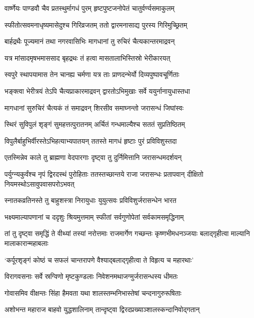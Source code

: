 \twolineshloka
{वार्ष्णेयः पाण्डवौ चैव प्रतस्थुर्मागधं पुरम्}
{हृष्टपुष्टजनोपेतं चातुर्वर्ण्यसमाकुलम्}


\twolineshloka
{स्फीतोत्सवमनाधृष्यमासेदुश्च गिरिव्रजतम्}
{ततो द्वारमनासाद्य पुरस्य गिरिमुच्छ्रितम्}


\twolineshloka
{बार्हद्रथैः पूज्यमानं तथा नगरवासिभिः}
{मागधानां तु रुचिरं चैत्यकान्तरमाद्रवन्}


\twolineshloka
{यत्र मांसादमृषभमाससाद बृहद्रथः}
{तं हत्वा मासतालाभिस्तिस्रो भेरीकारयत्}


\twolineshloka
{स्वपुरे स्थापयामास तेन चानह्य चर्मणा}
{यत्र ताः प्राणदन्भेर्यो दिव्यपुष्पावचूर्णिताः}


\twolineshloka
{भङ्क्त्वा भेरीत्रयं तेऽपि चैत्यप्राकारमाद्रवन्}
{द्वारतोऽभिमुखाः सर्वे ययुर्नानायुधास्तधा}


\twolineshloka
{मागधानां सुरुचिरं चैत्यकं तं समाद्रवन्}
{शिरसीव समाघ्नन्तो जरासन्धं जिघांस्वः}


\twolineshloka
{स्थिरं सुविपुलं शृङ्गं सुमहत्तत्पुरातनम्}
{अर्चितं गन्धमाल्यैश्च सततं सुप्रतिष्ठितम्}


\twolineshloka
{विपुलैर्बाहुभिर्वीरस्तेऽभिहत्याभ्यपातयन्}
{ततस्ते मागधं हृष्टाः पुरं प्रविविशुस्तदा}


\twolineshloka
{एतस्मिन्नेव काले तु ब्राह्मणा वेदपारगाः}
{दृष्ट्वा तु दुर्निमित्तानि जरासन्धमदर्शयन्}


\threelineshloka
{पर्युग्न्यकुर्वंश्च नृपं द्विरदस्थं पुरोहिताः}
{ततस्तच्छान्तये राजा जरासन्धः प्रतापवान्}
{दीक्षितो नियमस्थोऽसावुपवासपरोऽभवत्}


\twolineshloka
{स्नातकव्रतिनस्ते तु बाहुशस्त्रा निरायुधाः}
{युयुत्सवः प्रविविशुर्जरासन्धेन भारत}


\twolineshloka
{भक्ष्यमाल्यापणानां च ददृशुः श्रियमुत्तमाम्}
{स्फीतां सर्वगुणोपेतां सर्वकामसमृद्धिनाम्}


\threelineshloka
{तां तु दृष्ट्वा समृद्धिं ते वीथ्यां तस्यां नरोत्तमाः}
{राजमार्गेण गच्छन्तः कृष्णभीमधनञ्जयाः}
{बलाद्गृहीत्वा माल्यानि मालाकारान्महाबलाः}


\twolineshloka
{`कर्पूरशृङ्गं कोष्ठं च सफलं चान्तरापणे}
{वैश्याद्बलाद्गृहीत्वा ते विहृत्य च महारथाः'}


\twolineshloka
{विरागवसनाः सर्वे स्रग्विणो मृष्टकुण्डलाः}
{निवेशनमथाजग्मुर्जरासन्धस्य धीमतः}


\twolineshloka
{गोवासमिव वीक्षन्तः सिंहा हैमवता यथा}
{शालस्तम्भनिभास्तेषां चन्दनागुरुरूषिताः}


\twolineshloka
{अशोभन्त महाराज बाहवो युद्धशालिनाम्}
{तान्दृष्ट्वा द्विरदप्रख्याञ्शालस्कन्दानिवोद्गतान्}


